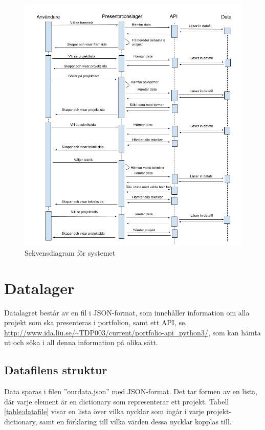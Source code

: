 \documentclass{TDP003mall}
\begin{document}
\begin{figure}[!]
  \centering
  \includegraphics[scale=0.5]{Sekvensdiagram}
  \caption{Sekvensdiagram för systemet}

\end{figure}


\pagebreak
\section{Datalager}

Datalagret består av en fil i JSON-format, som innehåller information om alla projekt som ska presenteras i portfolion, samt ett API, se. \url{http://www.ida.liu.se/~TDP003/current/portfolio-api_python3/}, som kan hämta ut och söka i all denna information på olika sätt.

\subsection{Datafilens struktur}
Data sparas i filen ''ourdata.json'' med JSON-format. Det tar formen av en lista, där varje element är en dictionary som representerar ett projekt. Tabell \ref{table:datafile} visar en lista över vilka nycklar som ingår i varje projekt-dictionary, samt en förklaring till vilka värden dessa nycklar kopplas till.
\end{document}
